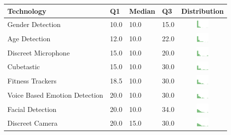 \begin{table}[h]
\begin{center}
\small
\begin{tabular}{| p{2.6cm} | p{.8cm} | p{.8cm} | p{.8cm} | c |}
\hline
Technology & Q1 &  Median & Q3 & Distribution  \\ 
\hline
Gender Detection & 10.0 & 10.0 & 15.0 & \includegraphics[width = 2cm, height = 0.5cm]{tex-inputs/table-images/genderdetectionben} \\ 
Age Detection & 12.0 & 10.0 & 22.0 & \includegraphics[width = 2cm, height = 0.5cm]{tex-inputs/table-images/agedetectionben} \\ 
Discreet Microphone & 15.0 & 10.0 & 20.0 & \includegraphics[width = 2cm, height = 0.5cm]{tex-inputs/table-images/discreetmicrophoneben} \\ 
Cubetastic & 15.0 & 10.0 & 30.0 & \includegraphics[width = 2cm, height = 0.5cm]{tex-inputs/table-images/cubetasticben} \\ 
Fitness Trackers & 18.5 & 10.0 & 30.0 & \includegraphics[width = 2cm, height = 0.5cm]{tex-inputs/table-images/fitnesstrackersben} \\ 
Voice Based Emotion Detection & 20.0 & 10.0 & 30.0 & \includegraphics[width = 2cm, height = 0.5cm]{tex-inputs/table-images/voicebasedemotiondetectionben} \\ 
Facial Detection & 20.0 & 10.0 & 34.0 & \includegraphics[width = 2cm, height = 0.5cm]{tex-inputs/table-images/facialdetectionben} \\ 
Discreet Camera & 20.0 & 15.0 & 30.0 & \includegraphics[width = 2cm, height = 0.5cm]{tex-inputs/table-images/discreetvideocameraben} \\ 

\end{tabular}
\end{center}
\end{table}
